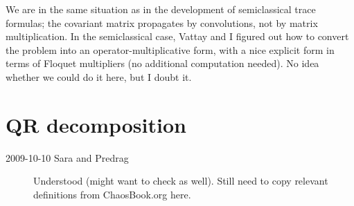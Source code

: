 \begin{description}
We are in the same situation as in the development of semiclassical trace formulas;
the covariant matrix propagates by convolutions, not by matrix multiplication.
In the semiclassical case, Vattay and I figured out how to convert the
problem into an operator-multiplicative form, with
a nice explicit form in terms of Floquet multipliers (no additional
computation needed). No idea whether we could do it here, but I doubt it.

\end{description}

\section{QR decomposition}

\begin{description}
\item[2009-10-10 Sara and Predrag] Understood
     (might want to check
     as well). Still need to copy
    relevant definitions from ChaosBook.org here.
\end{description}

